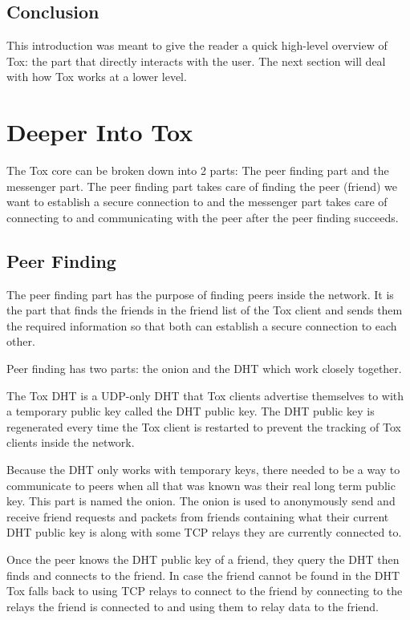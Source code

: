 \documentclass{tox}
\begin{document}
\subsection{Conclusion}

This introduction was meant to give the reader a quick high-level overview of 
Tox: the part that directly interacts with the user. The next section will deal 
with how Tox works at a lower level.

\section{Deeper Into Tox}

The Tox core can be broken down into 2 parts: The peer finding part and the 
messenger part. The peer finding part takes care of finding the peer (friend) 
we 
want to establish a secure connection to and the messenger part takes care of 
connecting to and communicating with the peer after the peer finding succeeds.

\subsection{Peer Finding}

The peer finding part has the purpose of finding peers inside the network. It 
is the part that finds the friends in the friend list of the Tox client and 
sends them the required information so that both can establish a secure 
connection to each other.

Peer finding has two parts: the onion and the DHT which work closely together.

The Tox DHT is a UDP-only DHT that Tox clients advertise themselves to with a 
temporary public key called the DHT public key. The DHT public key is 
regenerated every time the Tox client is restarted to prevent the tracking of 
Tox clients inside the network.

Because the DHT only works with temporary keys, there needed to be a way to 
communicate to peers when all that was known was their real long term public 
key. This part is named the onion. The onion is used to anonymously send and 
receive friend requests and packets from friends containing what their current 
DHT public key is along with some TCP relays they are currently connected to.

Once the peer knows the DHT public key of a friend, they query the DHT then 
finds and connects to the friend. In case the friend cannot be found in the DHT 
Tox falls back to using TCP relays to connect to the friend by connecting to 
the relays the friend is connected to and using them to relay data to the 
friend.
\end{document}
